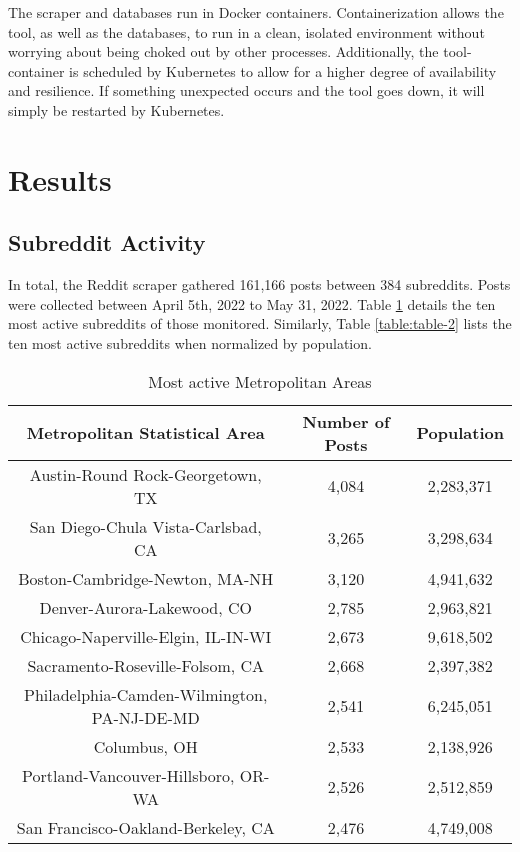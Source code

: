 \documentclass[12pt,oneside, letterpaper]{book}
\begin{document}
\par The scraper and databases run in Docker containers. Containerization allows the tool, as well as the databases, to run in a clean, isolated environment without worrying about being choked out by other processes. Additionally, the tool-container is scheduled by Kubernetes to allow for a higher degree of availability and resilience. If something unexpected occurs and the tool goes down, it will simply be restarted by Kubernetes.

\section{Results}

\subsection{Subreddit Activity}

\par In total, the Reddit scraper gathered 161,166 posts between 384 subreddits. Posts were collected between April 5th, 2022 to May 31, 2022. Table \ref{table:table-1} details the ten most active subreddits of those monitored. Similarly, Table \ref{table:table-2} lists the ten most active subreddits when normalized by population.

\begin{table}[h!]
    \centering
    \small
    \caption{Most active Metropolitan Areas}
    \begin{tabular}{| c | c | c |}
    \hline
    Metropolitan Statistical Area & Number of Posts & Population\\ \hline
    Austin-Round Rock-Georgetown, TX & 4,084 & 2,283,371 \\ \hline
    San Diego-Chula Vista-Carlsbad, CA & 3,265 & 3,298,634 \\ \hline
    Boston-Cambridge-Newton, MA-NH & 3,120 & 4,941,632 \\ \hline
    Denver-Aurora-Lakewood, CO & 2,785 & 2,963,821 \\ \hline
    Chicago-Naperville-Elgin, IL-IN-WI & 2,673 & 9,618,502 \\ \hline
    Sacramento-Roseville-Folsom, CA & 2,668 & 2,397,382 \\ \hline
    Philadelphia-Camden-Wilmington, PA-NJ-DE-MD & 2,541 & 6,245,051 \\ \hline
    Columbus, OH & 2,533 & 2,138,926 \\ \hline
    Portland-Vancouver-Hillsboro, OR-WA & 2,526 & 2,512,859 \\ \hline
    San Francisco-Oakland-Berkeley, CA & 2,476 & 4,749,008 \\ \hline
	\end{tabular}
	\label{table:table-1}
\end{table}
\end{document}
